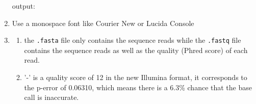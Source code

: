 \documentclass[12pt]{article}
\begin{document}
\begin{enumerate}
                output:\par
    \item Use a monospace font like Courier New or Lucida Console
    \item \begin{enumerate}[label=(\alph*),leftmargin=0.5in]
            \item the \texttt{.fasta} file only contains the sequence reads while the \texttt{.fastq} file contains the sequence reads as well as the quality (Phred score) of each read.
            \item '-' is a quality score of 12 in the new Illumina format, it corresponds to the p-error of 0.06310, which means there is a 6.3\% chance that the base call is inaccurate.
          \end{enumerate}
\end{enumerate}
\end{document}
